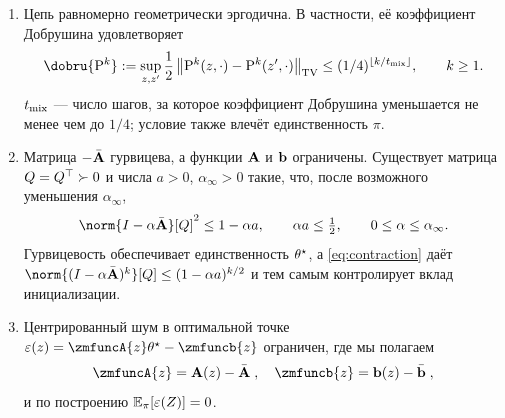 \documentclass[blind]{psta}
\begin{document}
\begin{enumerate}
\item Цепь равномерно геометрически эргодична. В частности, её коэффициент
Добрушина удовлетворяет
\[
 \dobru{\MKQ^k}
 :=\sup_{z,z'}\frac12\tvnorm{
 \MKQ^k(z,\cdot)-\MKQ^k(z',\cdot)}
 \leq(1/4)^{\floor{k/\taumix}},\qquad k\geq1.
\]
$t_{\operatorname{mix}}$ --- число шагов, за которое коэффициент Добрушина уменьшается не
менее чем до $1/4$; условие также влечёт единственность $\pi$.
\item Матрица $-\bar{\mathbf{A}}$ гурвицева, а функции $\mathbf{A}$ и $\mathbf{b}$ ограничены.
Существует матрица $Q=Q^\top\succ0$ и числа $a>0$,
$\alpha_\infty>0$ такие, что, после возможного уменьшения
$\alpha_\infty$,
\begin{equation}\label{eq:contraction}
 \norm{I-\alpha\bA}[Q]^2\leq 1-\alpha a,
 \qquad \alpha a\leq\tfrac12,
 \qquad 0\leq\alpha\leq\alpha_\infty .
\end{equation}
Гурвицевость обеспечивает единственность $\theta^\star$, а
\eqref{eq:contraction} даёт
$\norm{(I-\alpha\bA)^k}[Q]\brel\leq(1-\alpha a)^{k/2}$ и тем самым контролирует
вклад инициализации.
\item Центрированный шум в оптимальной точке
$\funcnoise{z}=\zmfuncA{z}\thetalim-\zmfuncb{z}$ ограничен, где мы полагаем
\begin{align*}
  \zmfuncA{z} = \zfuncA{z} - \bA\eqsp, \quad \zmfuncb{z} = \zfuncb{z} - \barb \eqsp,
\end{align*}
и по построению $\mathbb{E}_\pi[\varepsilon(Z)]=0$.
\end{enumerate}
\end{document}
